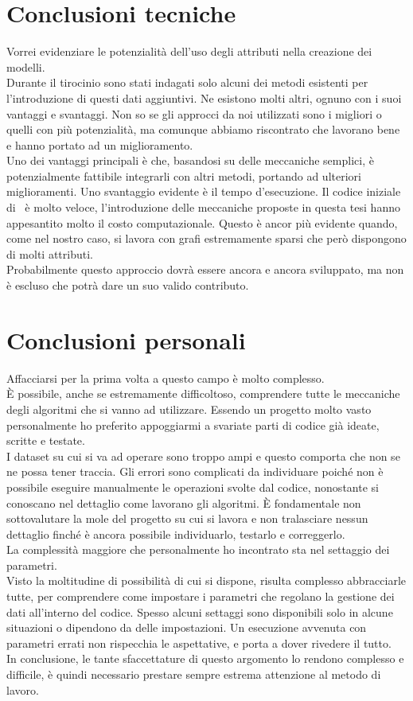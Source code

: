 \section*{Conclusioni tecniche}
Vorrei evidenziare le potenzialità dell'uso degli attributi nella creazione dei modelli.\\
Durante il tirocinio sono stati indagati solo alcuni dei metodi esistenti per l'introduzione di questi dati aggiuntivi. Ne esistono molti altri, ognuno con i suoi vantaggi e svantaggi. Non so se gli approcci da noi utilizzati sono i migliori o quelli con più potenzialità, ma comunque abbiamo riscontrato che lavorano bene e hanno portato ad un miglioramento.\\
Uno dei vantaggi principali è che, basandosi su delle meccaniche semplici, è potenzialmente fattibile integrarli con altri metodi, portando ad ulteriori miglioramenti. Uno svantaggio evidente è il tempo d'esecuzione. Il codice iniziale di \cnrl\ è molto veloce, l'introduzione delle meccaniche proposte in questa tesi hanno appesantito molto il costo computazionale. Questo è ancor più evidente quando, come nel nostro caso, si lavora con grafi estremamente sparsi che però dispongono di molti attributi.\\
Probabilmente questo approccio dovrà essere ancora e ancora sviluppato, ma non è escluso che potrà dare un suo valido contributo.
%
\section*{Conclusioni personali}
Affacciarsi per la prima volta a questo campo è molto complesso.\\
È possibile, anche se estremamente difficoltoso, comprendere tutte le meccaniche degli algoritmi che si vanno ad utilizzare. Essendo un progetto molto vasto personalmente ho preferito appoggiarmi a svariate parti di codice già ideate, scritte e testate.\\
I dataset su cui si va ad operare sono troppo ampi e questo comporta che non se ne possa tener traccia. Gli errori sono complicati da individuare poiché non è possibile eseguire manualmente le operazioni svolte dal codice, nonostante si conoscano nel dettaglio come lavorano gli algoritmi. È fondamentale non sottovalutare la mole del progetto su cui si lavora e non tralasciare nessun dettaglio finché è ancora possibile individuarlo, testarlo e correggerlo.\\
La complessità maggiore che personalmente ho incontrato sta nel settaggio dei parametri.\\
Visto la moltitudine di possibilità di cui si dispone, risulta complesso abbracciarle tutte, per comprendere come impostare i parametri che regolano la gestione dei dati all'interno del codice. Spesso alcuni settaggi sono disponibili solo in alcune situazioni o dipendono da delle impostazioni. Un esecuzione avvenuta con parametri errati non rispecchia le aspettative, e porta a dover rivedere il tutto.\\
In conclusione, le tante sfaccettature di questo argomento lo rendono complesso e difficile, è quindi necessario prestare sempre estrema attenzione al metodo di lavoro.

%




